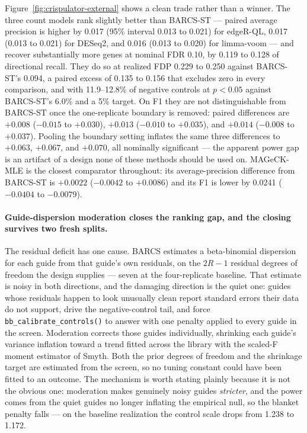 Figure~\ref{fig:crispulator-external} shows a clean trade rather than a
winner.  The three count models rank slightly better than BARCS-ST --- paired
average precision is higher by 0.017 (95\% interval 0.013 to 0.021) for
edgeR-QL, 0.017 (0.013 to 0.021) for DESeq2, and 0.016 (0.013 to 0.020) for
limma-voom --- and recover substantially more genes at nominal FDR 0.10, by
0.119 to 0.128 of directional recall.  They do so at realized FDP 0.229 to
0.250 against BARCS-ST's 0.094, a paired excess of 0.135 to 0.156 that
excludes zero in every comparison, and with 11.9--12.8\% of negative controls
at $p<0.05$ against BARCS-ST's 6.0\% and a 5\% target.  On F1 they are not
distinguishable from BARCS-ST once the one-replicate boundary is removed:
paired differences are $+0.008$ ($-0.015$ to $+0.030$), $+0.013$ ($-0.010$ to
$+0.035$), and $+0.014$ ($-0.008$ to $+0.037$).  Pooling the boundary setting
inflates the same three differences to $+0.063$, $+0.067$, and $+0.070$, all
nominally significant --- the apparent power gap is an artifact of a design
none of these methods should be used on.  MAGeCK-MLE is the closest
comparator throughout: its average-precision difference from BARCS-ST is
$+0.0022$ ($-0.0042$ to $+0.0086$) and its F1 is lower by 0.0241 ($-0.0404$ to
$-0.0079$).

\paragraph{Guide-dispersion moderation closes the ranking gap, and the closing
survives two fresh splits.}
The residual deficit has one cause.  BARCS estimates a beta-binomial
dispersion for each guide from that guide's own residuals, on the $2R-1$
residual degrees of freedom the design supplies --- seven at the
four-replicate baseline.  That estimate is noisy in both directions, and the
damaging direction is the quiet one: guides whose residuals happen to look
unusually clean report standard errors their data do not support, drive the
negative-control tail, and force \texttt{bb\_calibrate\_controls()} to answer
with one penalty applied to every guide in the screen.  Moderation corrects
those guides individually, shrinking each guide's variance inflation toward a
trend fitted across the library with the scaled-F moment estimator of Smyth.
Both the prior degrees of freedom and the shrinkage target are estimated from
the screen, so no tuning constant could have been fitted to an outcome.  The
mechanism is worth stating plainly because it is not the obvious one:
moderation makes genuinely noisy guides \emph{stricter}, and the power comes
from the quiet guides no longer inflating the empirical null, so the blanket
penalty falls --- on the baseline realization the control scale drops from
1.238 to 1.172.

